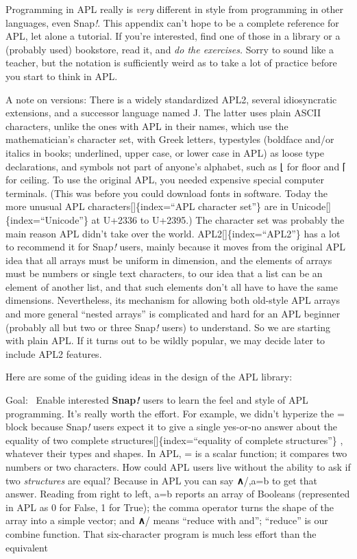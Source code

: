 \documentclass[
  letterpaper,
]{book}
\begin{document}
Programming in APL really is \emph{very} different in style from
programming in other languages, even Snap\emph{!}. This appendix can't
hope to be a complete reference for APL, let alone a tutorial. If you're
interested, find one of those in a library or a (probably used)
bookstore, read it, and \emph{do the exercises.} Sorry to sound like a
teacher, but the notation is sufficiently weird as to take a lot of
practice before you start to think in APL.

A note on versions: There is a widely standardized APL2, several
idiosyncratic extensions, and a successor language named J. The latter
uses plain ASCII characters, unlike the ones with APL in their names,
which use the mathematician's character set, with Greek letters,
typestyles (boldface and/or italics in books; underlined, upper case, or
lower case in APL) as loose type declarations, and symbols not part of
anyone's alphabet, such as ⌊ for floor and ⌈ for ceiling. To use the
original APL, you needed expensive special computer terminals. (This was
before you could download fonts in software. Today the more unusual APL
characters{[}{]}\{index=``APL character set''\} are in
Unicode{[}{]}\{index=``Unicode''\} at U+2336 to U+2395.) The character
set was probably the main reason APL didn't take over the world.
APL2{[}{]}\{index=``APL2''\} has a lot to recommend it for Snap\emph{!}
users, mainly because it moves from the original APL idea that all
arrays must be uniform in dimension, and the elements of arrays must be
numbers or single text characters, to our idea that a list can be an
element of another list, and that such elements don't all have to have
the same dimensions. Nevertheless, its mechanism for allowing both
old-style APL arrays and more general ``nested arrays'' is complicated
and hard for an APL beginner (probably all but two or three Snap\emph{!}
users) to understand. So we are starting with plain APL. If it turns out
to be wildly popular, we may decide later to include APL2 features.

Here are some of the guiding ideas in the design of the APL library:

Goal:~ Enable interested \textbf{Snap\emph{!}} users to learn the feel
and style of APL programming. It's really worth the effort. For example,
we didn't hyperize the = block because Snap\emph{!} users expect it to
give a single yes-or-no answer about the equality of two complete
structures{[}{]}\{index=``equality of complete structures''\} , whatever
their types and shapes. In APL, = is a scalar function; it compares two
numbers or two characters. How could APL users live without the ability
to ask if two \emph{structures} are equal? Because in APL you can say
\textbf{∧}/,a=b to get that answer. Reading from right to left, a=b
reports an array of Booleans (represented in APL as 0 for False, 1 for
True); the comma operator turns the shape of the array into a simple
vector; and \textbf{∧}/ means ``reduce with and''; ``reduce'' is our
combine function. That six-character program is much less effort than
the equivalent
\end{document}
